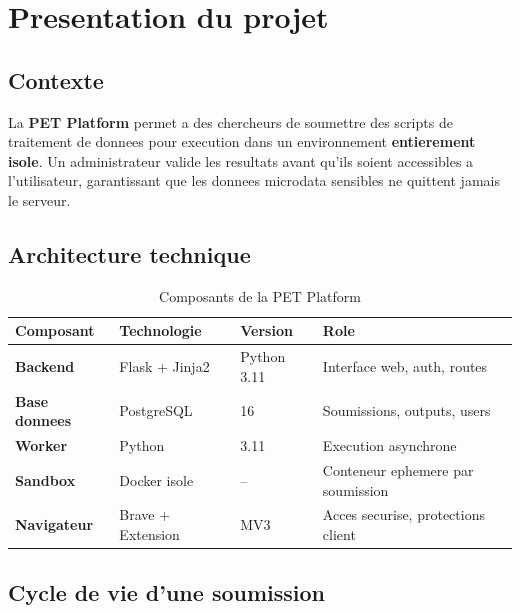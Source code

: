 \documentclass[12pt,a4paper]{article}
\begin{document}
\vspace{0.5cm}
\tableofcontents
\newpage

\section{Presentation du projet}

\subsection{Contexte}

La \textbf{PET Platform} permet a des chercheurs de soumettre des scripts de traitement
de donnees pour execution dans un environnement \textbf{entierement isole}. Un
administrateur valide les resultats avant qu'ils soient accessibles a l'utilisateur,
garantissant que les donnees microdata sensibles ne quittent jamais le serveur.

\subsection{Architecture technique}

\begin{table}[H]
\centering
\caption{Composants de la PET Platform}
\begin{tabularx}{\textwidth}{@{}>{\bfseries}lllX@{}}
\toprule
Composant & Technologie & Version & Role \\
\midrule
Backend       & Flask + Jinja2    & Python 3.11 & Interface web, auth, routes \\
Base donnees  & PostgreSQL        & 16          & Soumissions, outputs, users \\
Worker        & Python            & 3.11        & Execution asynchrone \\
Sandbox       & Docker isole      & --          & Conteneur ephemere par soumission \\
Navigateur    & Brave + Extension & MV3         & Acces securise, protections client \\
\bottomrule
\end{tabularx}
\end{table}

\subsection{Cycle de vie d'une soumission}
\end{document}
